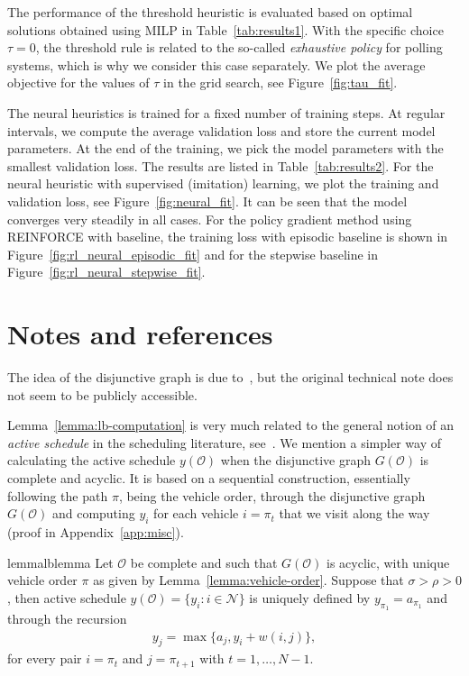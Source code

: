 \documentclass[a4paper]{report}
\theoremstyle{definition}
\theoremstyle{plain}
\begin{document}
The performance of the threshold heuristic is evaluated based on optimal
solutions obtained using MILP in Table~\ref{tab:results1}.
%
With the specific choice $\tau = 0$, the threshold rule is related to the
so-called \textit{exhaustive policy} for polling systems, which is why we
consider this case separately. We plot the average objective for the values of
$\tau$ in the grid search, see Figure~\ref{fig:tau_fit}.

The neural heuristics is trained for a fixed number of training steps. At
regular intervals, we compute the average validation loss and store the current
model parameters. At the end of the training, we pick the model parameters with
the smallest validation loss. The results are listed in Table~\ref{tab:results2}.
%
For the neural heuristic with supervised (imitation) learning, we plot the
training and validation loss, see Figure~\ref{fig:neural_fit}. It can be seen that the model
converges very steadily in all cases.
%
For the policy gradient method using REINFORCE with baseline, the training loss
with episodic baseline is shown in Figure~\ref{fig:rl_neural_episodic_fit} and
for the stepwise baseline in Figure~\ref{fig:rl_neural_stepwise_fit}.

% 

% 

\clearpage
\section{Notes and references}

The idea of the disjunctive graph is due to~\cite{roy1964disjunctive}, but the
original technical note does not seem to be publicly accessible.

Lemma~\ref{lemma:lb-computation} is very much related to the general notion of an \emph{active schedule} in
the scheduling literature, see~\cite[Definition 2.3.3]{pinedoSchedulingTheoryAlgorithms2016}.
%
We mention a simpler way of calculating the active schedule $y(\mathcal{O})$
when the disjunctive graph $G(\mathcal{O})$ is complete and acyclic.
%
It is based on a sequential construction, essentially following the path $\pi$,
being the vehicle order, through the disjunctive graph $G(\mathcal{O})$ and
computing $y_i$ for each vehicle $i = \pi_t$ that we visit along the way (proof
in Appendix~\ref{app:misc}).

\begin{restatable}{lemma}{lblemma}\label{lemma:lb-computation}
  Let $\mathcal{O}$ be complete and such that $G(\mathcal{O})$ is acyclic, with
  unique vehicle order $\pi$ as given by Lemma~\ref{lemma:vehicle-order}.
  Suppose that $\sigma > \rho > 0$, then active schedule
  $y(\mathcal{O}) = \{y_i : i \in \mathcal{N}\}$ is uniquely defined by
  $y_{\pi_1} = a_{\pi_1}$ and through the recursion
\begin{align}
  \label{eq:lb-computation}
  y_{j} = \max \{ a_{j}, y_i + w(i, j) \} ,
\end{align}
for every pair $i = \pi_t$ and $j = \pi_{t+1}$ with $t = 1, \dots, N-1$.
\end{restatable}
\end{document}
